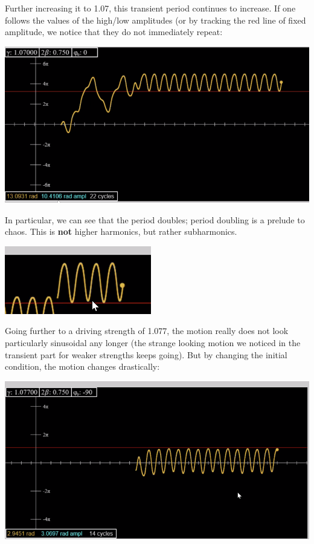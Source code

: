 Further increasing it to 1.07, this transient period continues to increase. If one follows the values of the high/low amplitudes (or by tracking the red line of fixed amplitude, we notice that they do not immediately repeat: 
\begin{center}
    \includegraphics[scale=0.5]{Lecture-32/l32-img4.png}
\end{center}
In particular, we can see that the period doubles; period doubling is a prelude to chaos. This is \textbf{not} higher harmonics, but rather subharmonics.
\begin{center}
    \includegraphics[scale=1]{Lecture-32/l32-img5.png}
\end{center}
Going further to a driving strength of 1.077, the motion really does not look particularly sinusoidal any longer (the strange looking motion we noticed in the transient part for weaker strengths keeps going). But by changing the initial condition, the motion changes drastically:
\begin{center}
    \includegraphics[scale=0.5]{Lecture-32/l32-img6.png}
\end{center}
